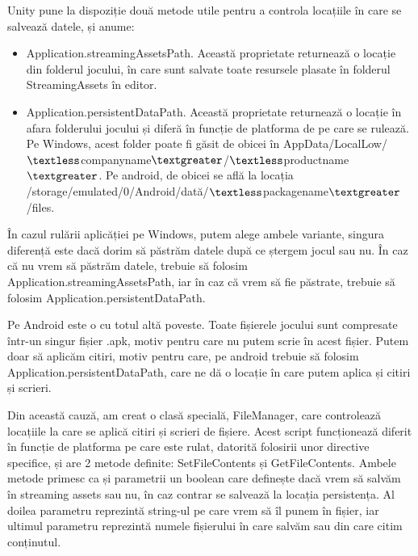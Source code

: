 \documentclass[12pt, a4paper]{article}
\begin{document}
	Unity pune la dispoziție două metode utile pentru a controla locațiile în care se salvează datele, și anume:
	
	\begin{itemize}
		\item Application.streamingAssetsPath. Această proprietate returnează o locație din folderul jocului, în care sunt salvate toate resursele plasate în folderul StreamingAssets în editor.
		\item Application.persistentDataPath. Această proprietate returnează o locație în afara folderului jocului și diferă în funcție de platforma de pe care se rulează. Pe Windows, acest folder poate fi găsit de obicei în \newline AppData/LocalLow/$\textless$companyname$\textgreater$/$\textless$productname$\textgreater$. Pe android, de obicei se află la locația \newline
		/storage/emulated/0/Android/dată/$\textless$packagename$\textgreater$/files.
	\end{itemize}
	
	În cazul rulării aplicăției pe Windows, putem alege ambele variante, singura diferență este dacă dorim să păstrăm datele după ce ștergem jocul sau nu. În caz că nu vrem să păstrăm datele, trebuie să folosim Application.streamingAssetsPath, iar în caz că vrem să fie păstrate, trebuie să folosim Application.persistentDataPath.
	\newline
	
	Pe Android este o cu totul altă poveste. Toate fișierele jocului sunt compresate într-un singur fișier .apk, motiv pentru care nu putem scrie în acest fișier. Putem doar să aplicăm citiri, motiv pentru care, pe android trebuie să folosim Application.persistentDataPath, care ne dă o locație în care putem aplica și citiri și scrieri.
	\newline
	
	Din această cauză, am creat o clasă specială, FileManager, care controlează locațiile la care se aplică citiri și scrieri de fișiere. Acest script funcționează diferit în funcție de platforma pe care este rulat, datorită folosirii unor directive specifice, și are 2 metode definite: SetFileContents și GetFileContents. Ambele metode primesc ca și parametrii un boolean care definește dacă vrem să salvăm în streaming assets sau nu, în caz contrar se salvează la locația persistența. Al doilea parametru reprezintă string-ul pe care vrem să îl punem în fișier, iar ultimul parametru reprezintă numele fișierului în care salvăm sau din care citim conținutul.
	
\end{document}
